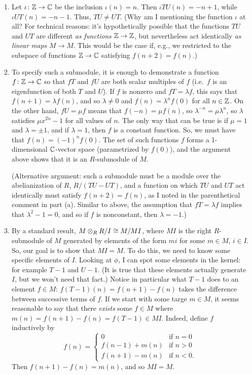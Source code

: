 \begin{solution}
\begin{enumerate}
    \item Let $\iota \colon \mathbb{Z} \to \mathbb{C}$ be the inclusion $\iota(n) = n$. Then $\iota TU(n) = -n+1$, while $\iota UT(n) = -n-1$. Thus, $TU \neq UT$. (Why am I mentioning the function $\iota$ at all? For technical reasons: it's hypothetically possible that the functions $TU$ and $UT$ are different \emph{as functions $\mathbb{Z} \to \mathbb{Z}$}, but nevertheless act identically \emph{as linear maps $M \to M$}. This would be the case if, e.g., we restricted to the subspace of functions $\mathbb{Z} \to \mathbb{C}$ satisfying $f(n+2) = f(n)$.)
    \item To specify such a submodule, it is enough to demonstrate a function $f\colon \mathbb{Z} \to \mathbb{C}$ so that $fT$ and $fU$ are both scalar multiples of $f$ (i.e.\ $f$ is an eigenfunction of both $T$ and $U$). If $f$ is nonzero and $fT = \lambda f$, this says that $f(n+1) = \lambda f(n)$, and so $\lambda \neq 0$ and $f(n) = \lambda^n f(0)$ for all $n \in \mathbb{Z}$. On the other hand, $fU = \mu f$ means that $f(-n) = \mu f(n)$, so $\lambda^{-n} = \mu \lambda^n$, so $\lambda$ satisfies $\mu x^{2n} - 1$ for all values of $n$. The only way that can be true is if $\mu = 1$ and $\lambda = \pm 1$, and if $\lambda = 1$, then $f$ is a constant function. So, we must have that $f(n) = (-1)^n f(0)$. The set of such functions $f$ forms a 1-dimensional $\mathbb{C}$-vector space (parametrized by $f(0)$), and the argument above shows that it is an $R$-submodule of $M$.

    (Alternative argument: such a submodule must be a module over the abelianization of $R$, $R/(TU-UT)$, and a function on which $TU$ and $UT$ act identically must satisfy $f(n+2) = f(n)$, as I noted in the parenthetical comment in part (a). Similar to above, the assumption that $fT = \lambda f$ implies that $\lambda^2-1 = 0$, and so if $f$ is nonconstant, then $\lambda = -1$.)
    \item By a standard result, $M \otimes_R R/I \cong M/MI$, where $MI$ is the right $R$-submodule of $M$ generated by elements of the form $mi$ for some $m \in M$, $i \in I$. So, our goal is to show that $MI = M$. To do this, we need to know some specific elements of $I$. Looking at $\phi$, I can spot some elements in the kernel: for example $T-1$ and $U-1$. (It is true that these elements actually generate $I$, but we won't need that fact.) Notice in particular what $T-1$ does to an element $f \in M$: $f(T-1)(n) = f(n+1)-f(n)$ takes the difference between successive terms of $f$. If we start with some targe $m \in M$, it seems reasonable to say that there \emph{exists} some $f\in M$ where $m(n) = f(n+1)-f(n) = f(T-1) \in MI$. Indeed, define $f$ inductively by
    \[f(n) = \left\{ \begin{array}{ll} 0 & \text{if } n = 0\\
    f(n-1) + m(n) & \text{if } n > 0\\
    f(n+1) - m(n) & \text{if } n < 0.
    \end{array} \right.\]
    Then $f(n+1) - f(n) = m(n)$, and so $MI = M$.
\end{enumerate}
\end{solution}

